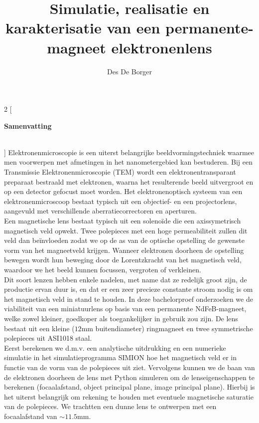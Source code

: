 \documentclass[we,twoside,openright,a4paper,11pt]{uantwerpenbamathesis}
\title{Simulatie, realisatie en karakterisatie van een permanente-magneet elektronenlens} %
\subtitle{}
\author{Des De Borger}
\begin{document}
\maketitle

\frontmatter

\tableofcontents

\mainmatter

\pagestyle{empty}
\thispagestyle{empty}

\makeatletter
\begin{multicols}{2}
[
\begin{center}
\textbf{
  \Large Samenvatting\\[1ex]
  \@title\\[1ex]
  \large \@author
}
\end{center}
]
Elektronenmicroscopie is een uiterst belangrijke beeldvormingstechniek waarmee men voorwerpen met afmetingen in het nanometergebied kan bestuderen. Bij een Transmissie Elektronenmicroscopie (TEM) wordt een elektronentransparant preparaat bestraald met elektronen, waarna het resulterende beeld uitvergroot en op een detector gefocust moet worden. Het elektronenoptisch systeem van een elektronenmicroscoop bestaat typisch uit een objectief- en een projectorlens, aangevuld met verschillende aberratiecorrectoren en aperturen.\\

Een magnetische lens bestaat typisch uit een solenoïde die een axissymetrisch magnetisch veld opwekt. Twee polepieces met een hoge permeabiliteit zullen dit veld dan beïnvloeden zodat we op de as van de optische opstelling de gewenste vorm van het magneetveld krijgen. Wanneer elektronen doorheen de opstelling bewegen wordt hun beweging door de Lorentzkracht van het magnetisch veld, waardoor we het beeld kunnen focussen, vergroten of verkleinen.\\

Dit soort lenzen hebben enkele nadelen, met name dat ze redelijk groot zijn, de productie ervan duur is, en dat er een zeer precieze constante stroom nodig is om het magnetisch veld in stand te houden. In deze bachelorproef onderzoeken we de viabiliteit van een miniatuurlens op basis van een permanente NdFeB-magneet, welke zowel kleiner, goedkoper als toegankelijker in gebruik zou zijn. De lens bestaat uit een kleine ($12\text{mm}$ buitendiameter) ringmagneet en twee symmetrische polepieces uit ASI1018 staal.\\

Eerst berekenen we d.m.v. een analytische uitdrukking en een numerieke simulatie in het simulatieprogramma SIMION hoe het magnetisch veld er in functie van de vorm van de polepieces uit ziet. Vervolgens kunnen we de baan van de elektronen doorheen de lens met Python simuleren om de lenseigenschappen te berekenen (focaalafstand, object principal plane, image principal plane). Hierbij is het uiterst belangrijk om rekening te houden met eventuele magnetische saturatie van de polepieces. We trachtten een dunne lens te ontwerpen met een focaalafstand van $\sim11.5\text{mm}$.\\


\end{multicols}
\end{document}
